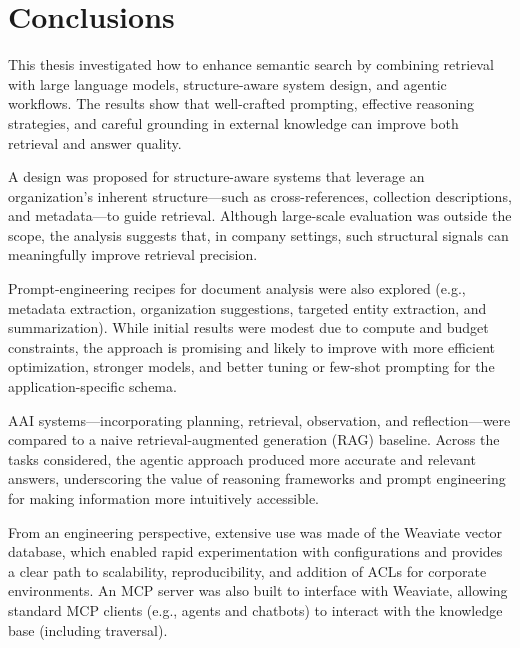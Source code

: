 \cleardoublepage%
\label{chap:conclusion}%


\section{Conclusions}

This thesis investigated how to enhance semantic search by combining retrieval with large language models, structure-aware system design, and agentic workflows. The results show that well-crafted prompting, effective reasoning strategies, and careful grounding in external knowledge can improve both retrieval and answer quality.

A design was proposed for structure-aware systems that leverage an organization's inherent structure—such as cross-references, collection descriptions, and metadata—to guide retrieval. Although large-scale evaluation was outside the scope, the analysis suggests that, in company settings, such structural signals can meaningfully improve retrieval precision.

Prompt-engineering recipes for document analysis were also explored (e.g., metadata extraction, organization suggestions, targeted entity extraction, and summarization). While initial results were modest due to compute and budget constraints, the approach is promising and likely to improve with more efficient optimization, stronger models, and better tuning or few-shot prompting for the application-specific schema.

\gls{AAI} systems—incorporating planning, retrieval, observation, and reflection—were compared to a naive retrieval-augmented generation (\gls{RAG}) baseline. Across the tasks considered, the agentic approach produced more accurate and relevant answers, underscoring the value of reasoning frameworks and prompt engineering for making information more intuitively accessible.

From an engineering perspective, extensive use was made of the Weaviate vector database, which enabled rapid experimentation with configurations and provides a clear path to scalability, reproducibility, and addition of \glspl{ACL} for corporate environments. An \gls{MCP} server was also built to interface with Weaviate, allowing standard \gls{MCP} clients (e.g., agents and chatbots) to interact with the knowledge base (including traversal).

